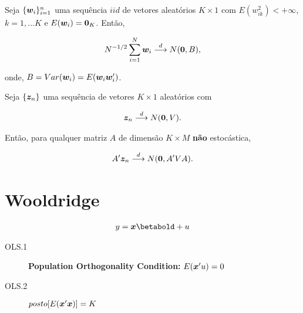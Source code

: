 \documentclass[11pt,oneside,a4paper]{article}
\numberwithin{equation}{section}
\begin{document}
\begin{def1}
Seja $\{\boldsymbol{w}_{i}\}_{i=1}^{n}$ uma sequência $iid$ de vetores aleatórios $K \times 1$ com
$E( w_{ik}^{2} ) < + \infty$, $k= 1, \dots K$ e $E( \boldsymbol{w}_{i} ) = \boldsymbol{0}_{K}$.
Então,

\vspace{-1 em}
\begin{align*}
	N^{-1/2} \sum_{i=1}^{N} \boldsymbol{w}_{i}  \overset{d}{\longrightarrow}  N(\boldsymbol{0}, B),
\end{align*}

\noindent
onde, $B=Var(\boldsymbol{w}_{i}) = E( \boldsymbol{w}_{i} \boldsymbol{w}_{i}')$.
\end{def1}

\begin{def1}[]
Seja $\{\boldsymbol{z}_{n}\}$ uma sequência de vetores $K \times 1$ aleatórios com 

\vspace{-1 em}
\begin{align*}
	\boldsymbol{z}_{n}  \overset{d}{\longrightarrow}  N(\boldsymbol{0}, V).
\end{align*}

Então, para qualquer matriz $A$ de dimensão $K \times M$ \textbf{não} estocástica,

\vspace{-1 em}
\begin{align*}
	A' \boldsymbol{z}_{n}  \overset{d}{\longrightarrow}  N(\boldsymbol{0}, A'VA).
\end{align*}
\end{def1}

\clearpage
\section{Wooldridge}
\noindent
\citet[Sec. 4.2.1 -- Consistency; p.52-4]{wool-2010}

\begin{align} \label{mod:vec}
	y = \mbs{x} \betabold + u
\end{align}

\begin{description}
	\item[OLS.1] \textbf{Population Orthogonality Condition:}  $E(\boldsymbol{x}'u) = 0$
	\item[OLS.2]  $posto[ E( \boldsymbol{x}' \boldsymbol{x} ) ] = K$
\end{description}
\end{document}
